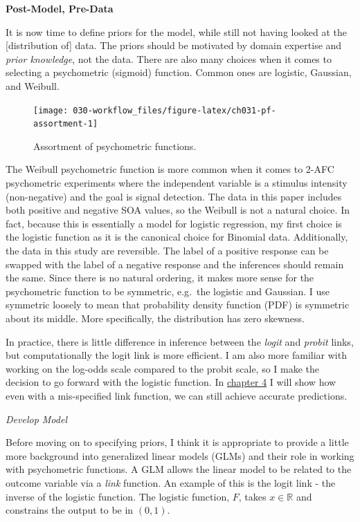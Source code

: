 \documentclass[11pt, oneside, openany]{scrbook}
\begin{document}
\textbf{Post-Model, Pre-Data}

It is now time to define priors for the model, while still not having looked at the {[}distribution of{]} data. The priors should be motivated by domain expertise and \emph{prior knowledge}, not the data. There are also many choices when it comes to selecting a psychometric (sigmoid) function. Common ones are logistic, Gaussian, and Weibull.

\begin{figure}

{\centering \texttt{[image: 030-workflow\_files/figure-latex/ch031-pf-assortment-1]} 

}

\caption{Assortment of psychometric functions.}\label{fig:ch031-pf-assortment}
\end{figure}

The Weibull psychometric function is more common when it comes to 2-AFC psychometric experiments where the independent variable is a stimulus intensity (non-negative) and the goal is signal detection. The data in this paper includes both positive and negative SOA values, so the Weibull is not a natural choice. In fact, because this is essentially a model for logistic regression, my first choice is the logistic function as it is the canonical choice for Binomial data. Additionally, the data in this study are reversible. The label of a positive response can be swapped with the label of a negative response and the inferences should remain the same. Since there is no natural ordering, it makes more sense for the psychometric function to be symmetric, e.g.~the logistic and Gaussian. I use symmetric loosely to mean that probability density function (PDF) is symmetric about its middle. More specifically, the distribution has zero skewness.

In practice, there is little difference in inference between the \emph{logit} and \emph{probit} links, but computationally the logit link is more efficient. I am also more familiar with working on the log-odds scale compared to the probit scale, so I make the decision to go forward with the logistic function. In \protect\hyperlink{model-checking}{chapter 4} I will show how even with a mis-specified link function, we can still achieve accurate predictions.

\emph{Develop Model}

Before moving on to specifying priors, I think it is appropriate to provide a little more background into generalized linear models (GLMs) and their role in working with psychometric functions. A GLM allows the linear model to be related to the outcome variable via a \emph{link} function. An example of this is the logit link - the inverse of the logistic function. The logistic function, \(F\), takes \(x \in \mathbb{R}\) and constrains the output to be in \((0, 1)\).
\end{document}
